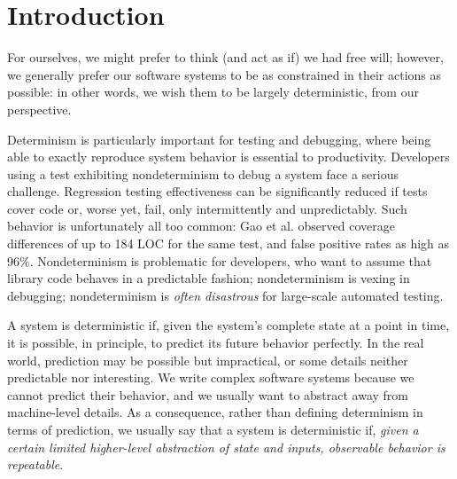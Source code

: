 \section{Introduction}

For ourselves, we might prefer to think (and act as if) we had free
will; however, we generally prefer our software systems to be as
constrained in their actions as possible:  in other words, we wish
them to be largely deterministic, from our perspective.

Determinism is particularly important for testing and debugging, where
being able to exactly reproduce system behavior is essential to
productivity.  Developers using a test exhibiting nondeterminism
to debug a system
face a serious challenge.
Regression testing
effectiveness can be significantly reduced if tests cover code or,
worse yet, fail, only
intermittently and unpredictably.  Such behavior is
unfortunately all too common:  Gao et
al. \cite{Gao:2015:MSU:2818754.2818764} observed coverage differences
of up to 184 LOC for the same test, and false positive rates
as high as 96\%.  Nondeterminism is problematic for
developers, who want to  assume that library code behaves in a  predictable fashion; nondeterminism is
vexing in debugging; nondeterminism is \emph{often disastrous} for large-scale 
automated testing.



A system is deterministic if, given the system's complete state at a point in
time, it is possible, in principle, to predict its future behavior
perfectly.  In the real world,
prediction may be possible but  impractical, or some details neither
predictable nor interesting.  We write
complex software systems because we cannot predict their
behavior, and we usually want to abstract away from machine-level details.  As a consequence, rather than
defining determinism in terms of prediction, we usually 
say that a system is deterministic if, \emph{given a certain limited
  higher-level abstraction of state
and inputs, observable behavior is repeatable}.  %

\begin{comment}
Because the
programmer's abstraction of the system ignores a large number of
details, very few tests are ``deterministic'' in the sense
that they eliminate all changes between executions.  Running the same test
twice almost always results in differences, given a low enough level of
abstraction, since the system load,
cache contents, branch predictor history, etc. are almost never
controlled for; however, what matters is when
some kind of nondeterminism unexpectedly impacts computed values at a
higher level of abstraction.
\end{comment}

